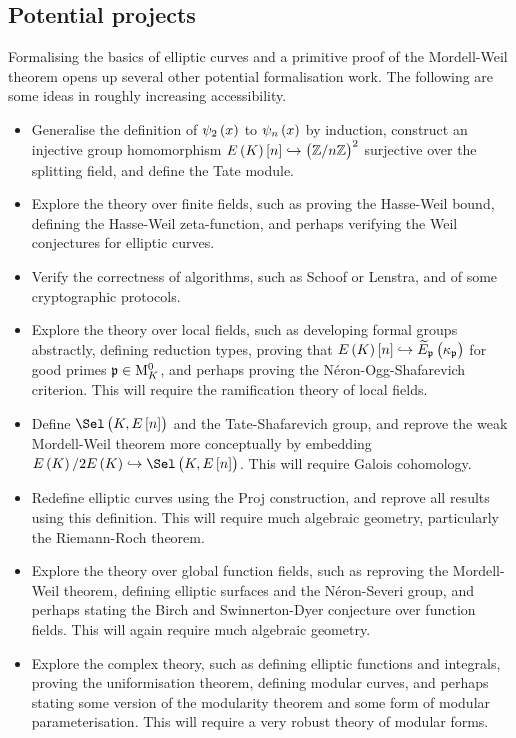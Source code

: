 \subsection{Potential projects}

Formalising the basics of elliptic curves and a primitive proof of the Mordell-Weil theorem opens up several other potential formalisation work. The following are some ideas in roughly increasing accessibility.
\begin{itemize}
\item Generalise the definition of $ \psi_2\br{x} $ to $ \psi_n\br{x} $ by induction, construct an injective group homomorphism $ E\br{K}\sbr{n} \hookrightarrow \br{\ZZ / n\ZZ}^2 $ surjective over the splitting field, and define the Tate module.
\item Explore the theory over finite fields, such as proving the Hasse-Weil bound, defining the Hasse-Weil zeta-function, and perhaps verifying the Weil conjectures for elliptic curves.
\item Verify the correctness of algorithms, such as Schoof or Lenstra, and of some cryptographic protocols.
\item Explore the theory over local fields, such as developing formal groups abstractly, defining reduction types, proving that $ E\br{K}\sbr{n} \hookrightarrow \widetilde{E}_\ppp\br{\kappa_\ppp} $ for good primes $ \mathfrak{p} \in \mathrm{M}_K^0 $, and perhaps proving the N\'eron-Ogg-Shafarevich criterion. This will require the ramification theory of local fields.
\item Define $ \Sel\br{K, E\sbr{n}} $ and the Tate-Shafarevich group, and reprove the weak Mordell-Weil theorem more conceptually by embedding $ E\br{K} / 2E\br{K} \hookrightarrow \Sel\br{K, E\sbr{n}} $. This will require Galois cohomology.
\item Redefine elliptic curves using the Proj construction, and reprove all results using this definition. This will require much algebraic geometry, particularly the Riemann-Roch theorem.
\item Explore the theory over global function fields, such as reproving the Mordell-Weil theorem, defining elliptic surfaces and the N\'eron-Severi group, and perhaps stating the Birch and Swinnerton-Dyer conjecture over function fields. This will again require much algebraic geometry.
\item Explore the complex theory, such as defining elliptic functions and integrals, proving the uniformisation theorem, defining modular curves, and perhaps stating some version of the modularity theorem and some form of modular parameterisation. This will require a very robust theory of modular forms.
\end{itemize}


